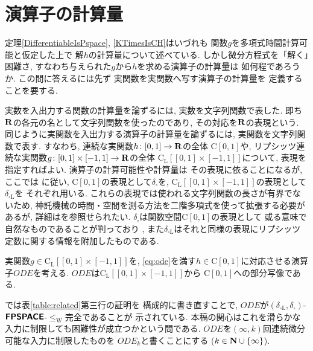 \section{演算子の計算量}

定理\ref{DifferentiableIsPspace}, 
\ref{KTimesIsCH}はいづれも
関数$g$を多項式時間計算可能と仮定した上で
解$h$の計算量について述べている. 
しかし微分方程式を「解く」困難さ, 
すなわち与えられた$g$から$h$を求める演算子の計算量は
如何程であろうか. 
この問に答えるには先ず
実関数を実関数へ写す演算子の計算量を
定義することを要する. 

\newcommand{\OpIVP}{\mathit{ODE}}
\newcommand{\deltabox}{\delta _\square}
\newcommand{\deltaboxLip}{\delta _{\square \mathrm L}}
\newcommand{\classtwofont}[1]{\text{\bfseries \sffamily \upshape #1}}
\newcommand{\classFPSPACEtwo}{\classtwofont{FPSPACE}}
\newcommand{\classCHtwo}{\classtwofont{CH}}
\newcommand{\redMF}{\leq _{\mathrm mf}}
\newcommand{\redW}{\leq _{\mathrm W}}
\newcommand{\redSW}{\leq _{\mathrm{sW}}}
\newcommand{\classLip}{\mathrm C _{\mathrm L}}
\newcommand{\classC}{\mathrm C}

実数を入出力する関数の計算量を論ずるには, 
実数を文字列関数で表した. 
即ち$\mathbf R$の各元の名として文字列関数を使ったのであり, 
その対応を$\mathbf R$の表現という. 
同じように実関数を入出力する演算子の計算量を論ずるには, 
実関数を文字列関数で表す. 
すなわち, 
連続な実関数$h \colon [0,1] \to \mathbf R$の全体
$\classC [0, 1]$や, 
リプシッツ連続な実関数$g \colon [0, 1] \times [-1, 1] \to \mathbf R$の全体
$\classLip [[0, 1] \times [-1, 1]]$について, 
表現を指定すればよい. 
演算子の計算可能性や計算量は
その表現に依ることになるが, 
ここでは
\cite{kawamura2010operators}に従い, 
$\classC [0, 1]$の表現として$\deltabox$を, 
$\classLip [[0, 1] \times [-1, 1]]$の表現として$\deltaboxLip$を
それぞれ用いる. 
これらの表現では使われる文字列関数の長さが有界でないため, 
神託機械の時間・空間を測る方法を二階多項式を使って拡張する必要があるが, 
詳細は\cite{kawamura2010operators}を参照せられたい. 
$\deltabox$は関数空間$\classC [0, 1]$の表現として
或る意味で自然なものであることが判っており
\cite{}, 
また$\deltaboxLip$はそれと同様の表現にリプシッツ定数に関する情報を附加したものである. 

実関数$g \in \classLip [[0, 1] \times [-1, 1]]$を, 
\eqref{eq:ode}を満す$h \in \classC [0, 1]$に対応させる演算子$\OpIVP$を考える. 
$\OpIVP$は$\classLip [[0, 1] \times [-1, 1]]$から
$\classC [0, 1]$への部分写像である. 

\cite{kawamura2010operators}では表\ref{table:related}第三行の証明を
構成的に書き直すことで, 
$\OpIVP$が$(\deltaboxLip, \deltabox)$-$\classFPSPACEtwo$-$\redW$完全であることが
示されている. 
本稿の関心はこれを滑らかな入力に制限しても困難性が成立つかという問である. 
$\OpIVP$を$(\infty, k)$回連続微分可能な入力に制限したものを
$\OpIVP _k$と書くことにする ($k \in \mathbf N \cup \{\infty\}$). 

